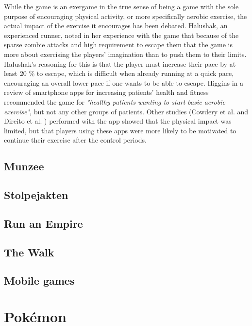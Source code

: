 While the game is an exergame in the true sense of being a game with the sole purpose of encouraging physical activity, or more specifically aerobic exercise, the actual impact of the exercise it encourages has been debated. Halushak, an experienced runner, noted in her experience with the game that because of the sparse zombie attacks and high requirement to escape them that the game is more about exercising the players' imagination than to push them to their limits. Halushak's reasoning for this is that the player must increase their pace by at least 20 \% to escape, which is difficult when already running at a quick pace, encouraging an overall lower pace if one wants to be able to escape. Higgins \cite{higgins2016smartphone} in a review of smartphone apps for increasing patients' health and fitness recommended the game for \emph{"healthy patients wanting to start basic aerobic exercise"}, but not any other groups of patients. Other studies (Cowdery et al. \cite{cowdery2015exergame} and Direito et al. \cite{direito2015apps}) performed with the app showed that the physical impact was limited, but that players using these apps were more likely to be motivated to continue their exercise after the control periods.

\section{Munzee}

\section{Stolpejakten}

\section{Run an Empire}

\section{The Walk}

\section{Mobile games}


\chapter{Pokémon}
\label{chapter:lit-study-pokemon-go}

